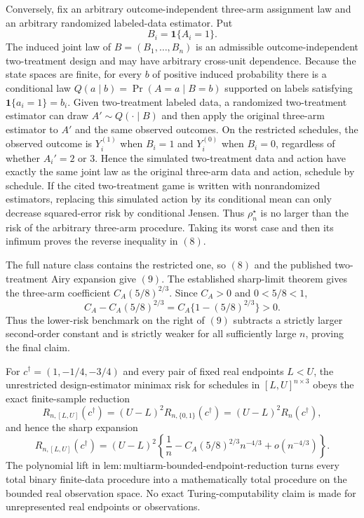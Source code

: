 Conversely, fix an arbitrary outcome-independent three-arm assignment law and an arbitrary randomized labeled-data estimator.  Put
\[
 B_i=\mathbf1\{A_i=1\}.
\]
The induced joint law of \(B=(B_1,\ldots,B_n)\) is an admissible outcome-independent two-treatment design and may have arbitrary cross-unit dependence.  Because the state spaces are finite, for every \(b\) of positive induced probability there is a conditional law
\(
Q(a\mid b)=\Pr(A=a\mid B=b)
\)
supported on labels satisfying
\(
\mathbf1\{a_i=1\}=b_i
\).  Given two-treatment labeled data, a randomized two-treatment estimator can draw \(A'\sim Q(\cdot\mid B)\) and then apply the original three-arm estimator to \(A'\) and the same observed outcomes.  On the restricted schedules, the observed outcome is \(Y_i^{(1)}\) when \(B_i=1\) and \(Y_i^{(0)}\) when \(B_i=0\), regardless of whether \(A_i'=2\) or \(3\).  Hence the simulated two-treatment data and action have exactly the same joint law as the original three-arm data and action, schedule by schedule.  If the cited two-treatment game is written with nonrandomized estimators, replacing this simulated action by its conditional mean can only decrease squared-error risk by conditional Jensen.  Thus \(\rho_n^\star\) is no larger than the risk of the arbitrary three-arm procedure.  Taking its worst case and then its infimum proves the reverse inequality in \((8)\).

The full nature class contains the restricted one, so \((8)\) and the published two-treatment Airy expansion give \((9)\).  The established sharp-limit theorem gives the three-arm coefficient \(C_A(5/8)^{2/3}\).  Since \(C_A>0\) and \(0<5/8<1\),
\[
 C_A-C_A(5/8)^{2/3}
 =C_A\{1-(5/8)^{2/3}\}>0.
\]
Thus the lower-risk benchmark on the right of \((9)\) subtracts a strictly larger second-order constant and is strictly weaker for all sufficiently large \(n\), proving the final claim.

For \(c^\dagger=(1,-1/4,-3/4)\) and every pair of fixed real endpoints \(L<U\), the unrestricted design-estimator minimax risk for schedules in \([L,U]^{n\times3}\) obeys the exact finite-sample reduction
\[
 R_{n,[L,U]}(c^\dagger)
 =(U-L)^2R_{n,\{0,1\}}(c^\dagger)
 =(U-L)^2R_n(c^\dagger),
\tag{11}
\]
and hence the sharp expansion
\[
 R_{n,[L,U]}(c^\dagger)
 =(U-L)^2\left\{
 \frac1n-C_A(5/8)^{2/3}n^{-4/3}+o(n^{-4/3})
 \right\}.
\tag{12}
\]
The polynomial lift in \(\mathrm{lem:multiarm\text{-}bounded\text{-}endpoint\text{-}reduction}\) turns every total binary finite-data procedure into a mathematically total procedure on the bounded real observation space.  No exact Turing-computability claim is made for unrepresented real endpoints or observations.

